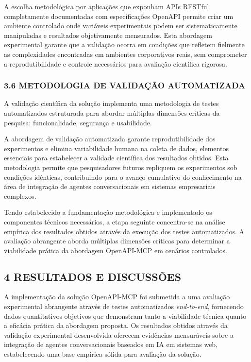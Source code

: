 \documentclass[
]{article}
\begin{document}
A escolha metodológica por aplicações que exponham APIs RESTful
completamente documentadas com especificações OpenAPI permite criar um
ambiente controlado onde variáveis experimentais podem ser
sistematicamente manipuladas e resultados objetivamente mensurados. Esta
abordagem experimental garante que a validação ocorra em condições que
refletem fielmente as complexidades encontradas em ambientes
corporativos reais, sem comprometer a reprodutibilidade e controle
necessários para avaliação científica rigorosa.

\subsubsection{3.6 METODOLOGIA DE VALIDAÇÃO
AUTOMATIZADA}\label{metodologia-de-validauxe7uxe3o-automatizada}

A validação científica da solução implementa uma metodologia de testes
automatizados estruturada para abordar múltiplas dimensões críticas da
pesquisa: funcionalidade, segurança e usabilidade.

A abordagem de validação automatizada garante reprodutibilidade dos
experimentos e elimina variabilidade humana na coleta de dados,
elementos essenciais para estabelecer a validade científica dos
resultados obtidos. Esta metodologia permite que pesquisadores futuros
repliquem os experimentos sob condições idênticas, contribuindo para o
avanço cumulativo do conhecimento na área de integração de agentes
conversacionais em sistemas empresariais complexos.

Tendo estabelecido a fundamentação metodológica e implementado os
componentes técnicos necessários, a etapa seguinte concentra-se na
análise empírica dos resultados obtidos através da execução dos testes
automatizados. A avaliação abrangente aborda múltiplas dimensões
críticas para determinar a viabilidade prática da abordagem OpenAPI-MCP
em cenários controlados.

\subsection{4 RESULTADOS E DISCUSSÕES}\label{resultados-e-discussuxf5es}

A implementação da solução OpenAPI-MCP foi submetida a uma avaliação
experimental abrangente através de testes automatizados
\emph{end-to-end}, fornecendo dados quantitativos objetivos que
demonstram tanto a viabilidade técnica quanto a eficácia prática da
abordagem proposta. Os resultados obtidos através da validação
experimental desenvolvida oferecem evidências mensuráveis sobre a
integração de agentes conversacionais baseados em IA em sistemas web,
estabelecendo uma base empírica sólida para avaliação da solução.
\end{document}
